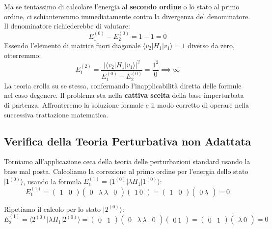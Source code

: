 Ma se tentassimo di calcolare l'energia al \textbf{secondo ordine} o lo stato al primo ordine, ci schianteremmo immediatamente contro la divergenza del denominatore. Il denominatore richiederebbe di valutare:
\begin{equation}
E_1^{(0)} - E_2^{(0)} = 1 - 1 = 0
\end{equation}
Essendo l'elemento di matrice fuori diagonale $\langle v_2 \vert{} H_1 \vert{} v_1 \rangle = 1$ diverso da zero, otterremmo:
\begin{equation}
E_1^{(2)} = \frac{|\langle v_2 | H_1 | v_1 \rangle|^2}{E_1^{(0)} - E_2^{(0)}} = \frac{1^2}{0} \implies \infty
\end{equation}
La teoria crolla su se stessa, confermando l'inapplicabilità diretta delle formule nel caso degenere. Il problema sta nella \textbf{cattiva scelta} della base imperturbata di partenza. Affronteremo la soluzione formale e il modo corretto di operare nella successiva trattazione matematica.

\subsection{Verifica della Teoria Perturbativa non Adattata}

Torniamo all'applicazione ceca della teoria delle perturbazioni standard usando la base mal posta. Calcoliamo la correzione al primo ordine per l'energia dello stato $\vert{}1^{(0)}\rangle$, usando la formula $E_1^{(1)} = \langle 1^{(0)} \vert{} \lambda H_1 \vert{} 1^{(0)} \rangle$:
\begin{equation}
E_1^{(1)} = \begin{pmatrix} 1 & 0 \end{pmatrix} \begin{pmatrix} 0 & \lambda \ \lambda & 0 \end{pmatrix} \begin{pmatrix} 1 \ 0 \end{pmatrix} = \begin{pmatrix} 1 & 0 \end{pmatrix} \begin{pmatrix} 0 \ \lambda \end{pmatrix} = 0
\end{equation}

Ripetiamo il calcolo per lo stato $\vert{}2^{(0)}\rangle$:
\begin{equation}
E_2^{(1)} = \langle 2^{(0)} | \lambda H_1 | 2^{(0)} \rangle = \begin{pmatrix} 0 & 1 \end{pmatrix} \begin{pmatrix} 0 & \lambda \ \lambda & 0 \end{pmatrix} \begin{pmatrix} 0 \ 1 \end{pmatrix} = \begin{pmatrix} 0 & 1 \end{pmatrix} \begin{pmatrix} \lambda \ 0 \end{pmatrix} = 0
\end{equation}

